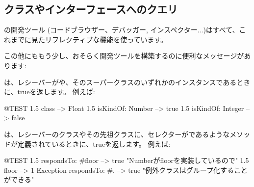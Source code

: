 \documentclass[a4paper,10pt,twoside]{book}
\begin{document}
\subsection{クラスやインターフェースへのクエリ}

\pharo の開発ツール (コードブラウザー、デバッガー, インスペクター...)はすべて、これまでに見たリフレクティブな機能を使っています。

この他にももう少し、おそらく開発ツールを構築するのに便利なメッセージがあります:

は、レシーバーがや、そのスーパークラスのいずれかのインスタンスであるときに、trueを返します。
例えば:
\begin{code}{@TEST}
1.5 class                     --> Float
1.5 isKindOf: Number --> true
1.5 isKindOf: Integer   --> false
\end{code}

は、レシーバーのクラスやその先祖クラスに、セレクターがであるようなメソッドが定義されているときに、trueを返します。%
例えば:
\begin{code}{@TEST}
1.5 respondsTo: #floor      --> true    "Numberがfloorを実装しているので"
1.5 floor                            --> 1
Exception respondsTo: #, --> true    "例外クラスはグループ化することができる"
\end{code}
\end{document}
